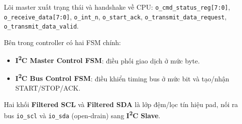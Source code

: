 Lõi master xuất trạng thái và handshake về CPU: \texttt{o\_cmd\_status\_reg[7:0]}, \texttt{o\_receive\_data[7:0]}, \texttt{o\_int\_n}, \texttt{o\_start\_ack}, \texttt{o\_transmit\_data\_request}, \texttt{o\_transmit\_data\_valid}.

Bên trong controller có hai FSM chính:
\begin{itemize}[leftmargin=1.2cm]
    \item \textbf{I\textsuperscript{2}C Master Control FSM}: điều phối giao dịch ở mức byte.
    \item \textbf{I\textsuperscript{2}C Bus Control FSM}: điều khiển timing bus ở mức bit và tạo/nhận START/STOP/ACK.
\end{itemize}

Hai khối \textbf{Filtered SCL} và \textbf{Filtered SDA} là lớp đệm/lọc tín hiệu pad, nối ra bus \texttt{io\_scl} và \texttt{io\_sda} (open-drain) sang \textbf{I\textsuperscript{2}C Slave}.

